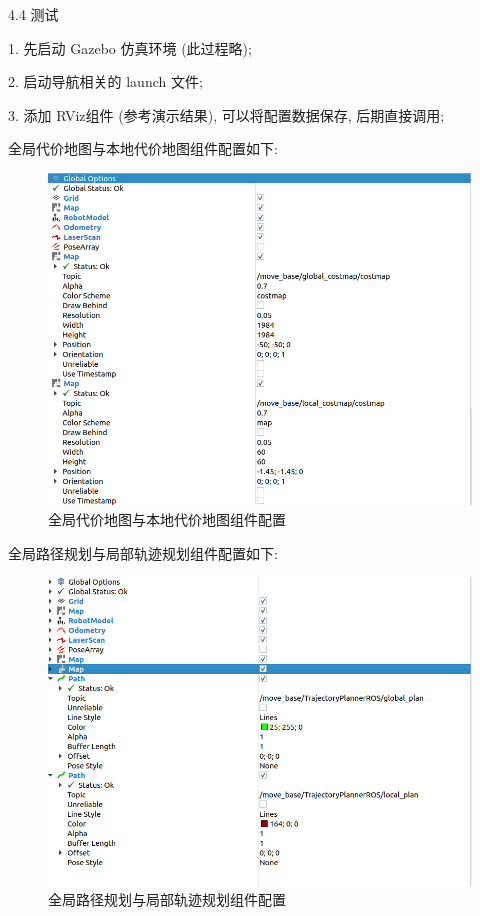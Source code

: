 \documentclass[openany, fontset=windowsold]{ctexbook}
\theoremstyle{kaiti}
\theoremstyle{normal}
\begin{document}
4.4 测试

1. 先启动 Gazebo 仿真环境 (此过程略); 

2. 启动导航相关的 launch 文件; 

3. 添加 RViz组件 (参考演示结果), 可以将配置数据保存, 后期直接调用; 

全局代价地图与本地代价地图组件配置如下:

\begin{figure}[!ht]
  \centering
  \includegraphics[width=.9\textwidth]{ros_demo_nav_rviz_costmap.png}
  \caption{全局代价地图与本地代价地图组件配置}
  \label{fig:ros_demo_nav_rviz_costmap}
\end{figure}

全局路径规划与局部轨迹规划组件配置如下:

\begin{figure}[!ht]
  \centering
  \includegraphics[width=.9\textwidth]{ros_demo_nav_rviz_motion_planning.png}
  \caption{全局路径规划与局部轨迹规划组件配置}
  \label{fig:ros_demo_nav_rviz_motion_planning}
\end{figure}
\end{document}
